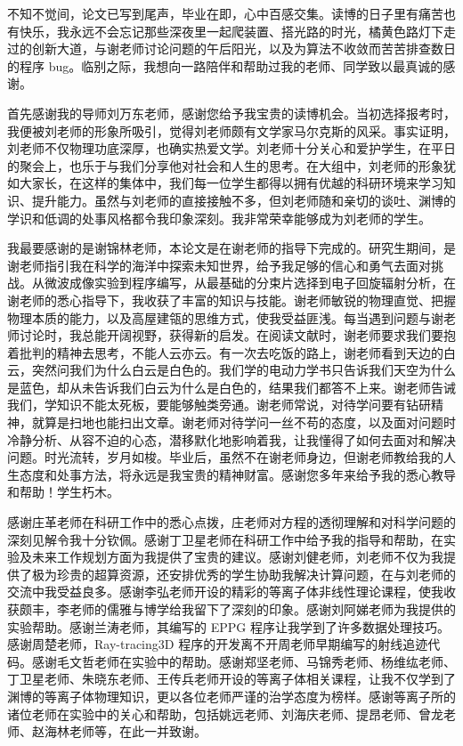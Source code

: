 \begin{acknowledgements}
不知不觉间，论文已写到尾声，毕业在即，心中百感交集。读博的日子里有痛苦也有快乐，我永远不会忘记那些深夜里一起爬装置、搭光路的时光，橘黄色路灯下走过的创新大道，与谢老师讨论问题的午后阳光，以及为算法不收敛而苦苦排查数日的程序 bug。临别之际，我想向一路陪伴和帮助过我的老师、同学致以最真诚的感谢。

首先感谢我的导师刘万东老师，感谢您给予我宝贵的读博机会。当初选择报考时，我便被刘老师的形象所吸引，觉得刘老师颇有文学家马尔克斯的风采。事实证明，刘老师不仅物理功底深厚，也确实热爱文学。刘老师十分关心和爱护学生，在平日的聚会上，也乐于与我们分享他对社会和人生的思考。在大组中，刘老师的形象犹如大家长，在这样的集体中，我们每一位学生都得以拥有优越的科研环境来学习知识、提升能力。虽然与刘老师的直接接触不多，但刘老师随和亲切的谈吐、渊博的学识和低调的处事风格都令我印象深刻。我非常荣幸能够成为刘老师的学生。

我最要感谢的是谢锦林老师，本论文是在谢老师的指导下完成的。研究生期间，是谢老师指引我在科学的海洋中探索未知世界，给予我足够的信心和勇气去面对挑战。从微波成像实验到程序编写，从最基础的分束片选择到电子回旋辐射分析，在谢老师的悉心指导下，我收获了丰富的知识与技能。谢老师敏锐的物理直觉、把握物理本质的能力，以及高屋建瓴的思维方式，使我受益匪浅。每当遇到问题与谢老师讨论时，我总能开阔视野，获得新的启发。在阅读文献时，谢老师要求我们要抱着批判的精神去思考，不能人云亦云。有一次去吃饭的路上，谢老师看到天边的白云，突然问我们为什么白云是白色的。我们学的电动力学书只告诉我们天空为什么是蓝色，却从未告诉我们白云为什么是白色的，结果我们都答不上来。谢老师告诫我们，学知识不能太死板，要能够触类旁通。谢老师常说，对待学问要有钻研精神，就算是扫地也能扫出文章。谢老师对待学问一丝不苟的态度，以及面对问题时冷静分析、从容不迫的心态，潜移默化地影响着我，让我懂得了如何去面对和解决问题。时光流转，岁月如梭。毕业后，虽然不在谢老师身边，但谢老师教给我的人生态度和处事方法，将永远是我宝贵的精神财富。感谢您多年来给予我的悉心教导和帮助！学生朽木。
 
感谢庄革老师在科研工作中的悉心点拨，庄老师对方程的透彻理解和对科学问题的深刻见解令我十分钦佩。感谢丁卫星老师在科研工作中给予我的指导和帮助，在实验及未来工作规划方面为我提供了宝贵的建议。感谢刘健老师，刘老师不仅为我提供了极为珍贵的超算资源，还安排优秀的学生协助我解决计算问题，在与刘老师的交流中我受益良多。感谢李弘老师开设的精彩的等离子体非线性理论课程，使我收获颇丰，李老师的儒雅与博学给我留下了深刻的印象。感谢刘阿娣老师为我提供的实验帮助。感谢兰涛老师，其编写的 EPPG 程序让我学到了许多数据处理技巧。感谢周楚老师，Ray-tracing3D 程序的开发离不开周老师早期编写的射线追迹代码。感谢毛文哲老师在实验中的帮助。感谢郑坚老师、马锦秀老师、杨维纮老师、丁卫星老师、朱晓东老师、王传兵老师开设的等离子体相关课程，让我不仅学到了渊博的等离子体物理知识，更以各位老师严谨的治学态度为榜样。感谢等离子所的诸位老师在实验中的关心和帮助，包括姚远老师、刘海庆老师、提昂老师、曾龙老师、赵海林老师等，在此一并致谢。


\end{acknowledgements}
